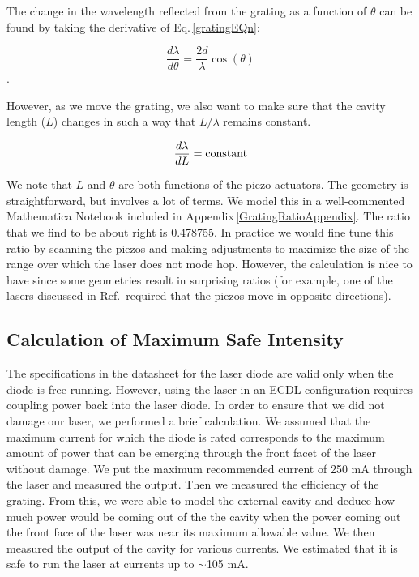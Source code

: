 The change in the wavelength reflected from the grating as a function of $\theta$ can be found by taking the derivative of Eq.\,\ref{gratingEQn}:

\begin{equation}
    \frac{d\lambda}{d \theta}= \frac{2d}{\lambda} \cos(\theta)
\end{equation}.

However, as we move the grating, we also want to make sure that the cavity length ($L$) changes in such a way that $L/\lambda$ remains constant. 

\begin{equation}
    \frac{d \lambda}{d L}= \textnormal{constant} 
\end{equation}

We note that $L$ and $\theta$ are both functions of the piezo actuators. The geometry is straightforward, but involves a lot of terms. We model this in a well-commented Mathematica Notebook included in Appendix\,\ref{GratingRatioAppendix}. The ratio that we find to be about right is 0.478755. In practice we would fine tune this ratio by scanning the piezos and making adjustments to maximize the size of the range over which the laser does not mode hop. However, the calculation is nice to have since some geometries result in surprising ratios (for example, one of the lasers discussed in Ref.\,\cite{cjeDiss} required that the piezos move in opposite directions).


\subsection{Calculation of Maximum Safe Intensity}

The specifications in the datasheet for the laser diode are valid only when the diode is free running. However, using the laser in an ECDL configuration requires coupling power back into the laser diode. In order to ensure that we did not damage our laser, we performed a brief calculation. We assumed that the maximum current for which the diode is rated corresponds to the maximum amount of power that can be emerging through the front facet of the laser without damage. We put the maximum recommended current of 250 mA through the laser and measured the output. Then we measured the efficiency of the grating. From this, we were able to model the external cavity and deduce how much power would be coming out of the the cavity when the power coming out the front face of the laser was near its maximum allowable value. We then measured the output of the cavity for various currents. We estimated that it is safe to run the laser at currents up to $\sim$105 mA. 

 





